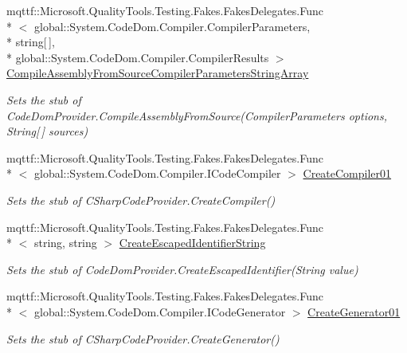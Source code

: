 \begin{DoxyCompactItemize}
mqttf\-::\-Microsoft.\-Quality\-Tools.\-Testing.\-Fakes.\-Fakes\-Delegates.\-Func\\*
$<$ global\-::\-System.\-Code\-Dom.\-Compiler.\-Compiler\-Parameters, \\*
string\mbox{[}$\,$\mbox{]}, \\*
global\-::\-System.\-Code\-Dom.\-Compiler.\-Compiler\-Results $>$ \hyperlink{class_microsoft_1_1_c_sharp_1_1_fakes_1_1_stub_c_sharp_code_provider_ab495a4ee3550993fb15dd6414f5525fa}{Compile\-Assembly\-From\-Source\-Compiler\-Parameters\-String\-Array}
\begin{DoxyCompactList}\small\item\em Sets the stub of Code\-Dom\-Provider.\-Compile\-Assembly\-From\-Source(\-Compiler\-Parameters options, String\mbox{[}$\,$\mbox{]} sources)\end{DoxyCompactList}\item 
mqttf\-::\-Microsoft.\-Quality\-Tools.\-Testing.\-Fakes.\-Fakes\-Delegates.\-Func\\*
$<$ global\-::\-System.\-Code\-Dom.\-Compiler.\-I\-Code\-Compiler $>$ \hyperlink{class_microsoft_1_1_c_sharp_1_1_fakes_1_1_stub_c_sharp_code_provider_a84110bd4edca05dfc523b9582f1d4e04}{Create\-Compiler01}
\begin{DoxyCompactList}\small\item\em Sets the stub of C\-Sharp\-Code\-Provider.\-Create\-Compiler()\end{DoxyCompactList}\item 
mqttf\-::\-Microsoft.\-Quality\-Tools.\-Testing.\-Fakes.\-Fakes\-Delegates.\-Func\\*
$<$ string, string $>$ \hyperlink{class_microsoft_1_1_c_sharp_1_1_fakes_1_1_stub_c_sharp_code_provider_a161efa5e8158aadf5c0b24359a73252a}{Create\-Escaped\-Identifier\-String}
\begin{DoxyCompactList}\small\item\em Sets the stub of Code\-Dom\-Provider.\-Create\-Escaped\-Identifier(\-String value)\end{DoxyCompactList}\item 
mqttf\-::\-Microsoft.\-Quality\-Tools.\-Testing.\-Fakes.\-Fakes\-Delegates.\-Func\\*
$<$ global\-::\-System.\-Code\-Dom.\-Compiler.\-I\-Code\-Generator $>$ \hyperlink{class_microsoft_1_1_c_sharp_1_1_fakes_1_1_stub_c_sharp_code_provider_af26eef64d60e9b09f2e7cd10586fddde}{Create\-Generator01}
\begin{DoxyCompactList}\small\item\em Sets the stub of C\-Sharp\-Code\-Provider.\-Create\-Generator()\end{DoxyCompactList}\item 

\end{DoxyCompactItemize}

